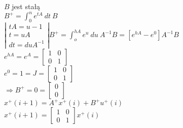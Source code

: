 $B$ jest stałą\\
$B^+=\int^n_0e^{tA} \ dt \ B$\\
$\left| \begin{array}{c}tA=u-1\\t=uA \\dt=duA^{-1} \end{array}\right| B^+=\int_o^{hA}e^u\ du\ A^{-1}B=[e^{hA}-e^0]A^{-1}B$\\
$e^{hA}=e^A=\left[ \begin{array}{cc}     1&0\\0& 1   \end{array}\right]$\\
$e^0=1=J=\left[ \begin{array}{cc}     1&0\\0& 1   \end{array}\right]$\\
$\Rightarrow B^+=0=\left[ \begin{array}{c}    0\\0    \end{array}\right]$\\
$x^+(i+1)=A^+x^+(i)+B^+u^+(i)$\\
$x^+(i+1)=\left[ \begin{array}{cc}    1&0\\0&1    \end{array}\right]x^+(i)$\\


\pagebreak
